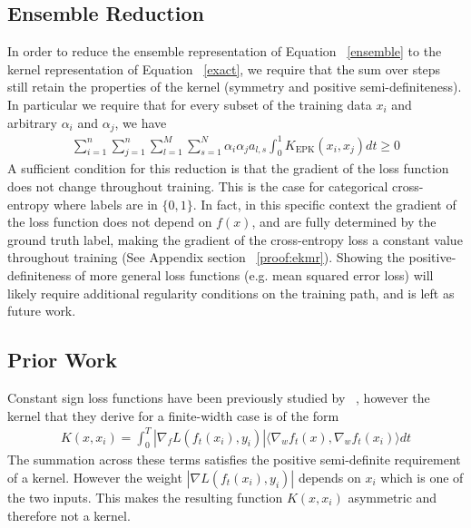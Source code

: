 \subsection{Ensemble Reduction}
In order to reduce the ensemble representation of Equation ~\eqref{ensemble} to the kernel representation of Equation ~\eqref{exact}, we require that the sum over steps still retain the properties of the kernel (symmetry and positive semi-definiteness). In particular we require that for every subset of the training data ${x_i}$ and arbitrary ${\alpha_i}$ and ${\alpha_j}$, we have
\begin{align}
    \sum_{i=1}^n\sum_{j=1}^n \sum_{l=1}^M \sum_{s=1}^N \alpha_i \alpha_j a_{l, s}\int_{0}^1 K_{\text{EPK}}(x_i,x_j) dt \geq 0
\end{align}
A sufficient condition for this reduction is that the gradient of the loss function does not change throughout training. This is the case for categorical cross-entropy where labels are in $\{0,1\}$. In fact, in this specific context the gradient of the loss function does not depend on $f(x)$, and are fully determined by the ground truth label, making the gradient of the cross-entropy loss a constant value throughout training (See Appendix section ~\ref{proof:ekmr}). Showing the positive-definiteness of more general loss functions (e.g. mean squared error loss) will likely require additional regularity conditions on the training path, and is left as future work.

\subsection{Prior Work}
\label{subsec:disc}
Constant sign loss functions have been previously studied by ~\citet{chen2021equivalence}, however the kernel that they derive for a finite-width case is of the form
\begin{align}
    K(x,x_i) =  \int_0^T |\nabla_f L(f_t(x_i), y_i)| \langle \nabla_w f_t(x), \nabla_w f_t(x_i) \rangle dt
\end{align}
The summation across these terms satisfies the positive semi-definite requirement of a kernel. However the weight $|\nabla L(f_t(x_i), y_i)|$ depends on $x_i$ which is one of the two inputs. This makes the resulting function $K(x,x_i)$ asymmetric and therefore not a kernel.

